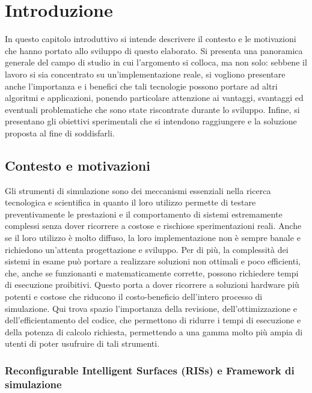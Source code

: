 \chapter{Introduzione}
\label{ch:introduzione}

In questo capitolo introduttivo si intende descrivere il contesto e le
motivazioni che hanno portato allo sviluppo di questo elaborato. Si presenta una
panoramica generale del campo di studio in cui l'argomento si colloca, ma non
solo: sebbene il lavoro si sia concentrato su un'implementazione reale, si
vogliono presentare anche l'importanza e i benefici che tali tecnologie possono
portare ad altri algoritmi e applicazioni, ponendo particolare attenzione ai vantaggi,
svantaggi ed eventuali problematiche che sono state riscontrate durante lo
sviluppo. Infine, si presentano gli obiettivi sperimentali che si intendono
raggiungere e la soluzione proposta al fine di soddisfarli.

\section{Contesto e motivazioni}
\label{sec:contesto}

Gli strumenti di simulazione sono dei meccanismi essenziali nella ricerca tecnologica
e scientifica in quanto il loro utilizzo permette di testare preventivamente le prestazioni
e il comportamento di sistemi estremamente complessi senza dover ricorrere a costose
e rischiose sperimentazioni reali. Anche se il loro utilizzo è molto diffuso, la
loro implementazione non è sempre banale e richiedono un'attenta progettazione e
sviluppo. Per di più, la complessità dei sistemi in esame può portare a realizzare
soluzioni non ottimali e poco efficienti, che, anche se funzionanti e matematicamente
corrette, possono richiedere tempi di esecuzione proibitivi. Questo porta a dover
ricorrere a soluzioni hardware più potenti e costose che riducono il costo-beneficio
dell'intero processo di simulazione. Qui trova spazio l'importanza della
revisione, dell'ottimizzazione e dell'efficientamento del codice, che permettono
di ridurre i tempi di esecuzione e della potenza di calcolo richiesta, permettendo
a una gamma molto più ampia di utenti di poter usufruire di tali strumenti.

\subsection{Reconfigurable Intelligent Surfaces (RISs) e Framework di
simulazione}
\label{subsec:risframework}

